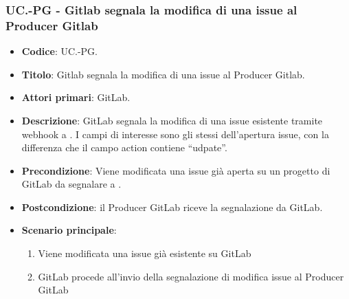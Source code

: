 
\subsubsection{UC\theuccount.\thesubuccount-PG - Gitlab segnala la modifica di una issue al Producer Gitlab}
\begin{itemize}
    \item \textbf{Codice}: UC\theuccount.\thesubuccount-PG.
    \item \textbf{Titolo}: Gitlab segnala la modifica di una issue al Producer Gitlab.
    \item \textbf{Attori primari}: GitLab.
    \item \textbf{Descrizione}: GitLab segnala la modifica di una issue esistente tramite webhook a
    \newline \progetto.
    I campi di interesse sono gli stessi dell'apertura issue, con la differenza che il campo action contiene ``udpate''.
    \item \textbf{Precondizione}: Viene modificata una issue già aperta su un
    progetto di GitLab da segnalare a \progetto.
    \item \textbf{Postcondizione}: il Producer GitLab riceve la segnalazione da GitLab.
    \item \textbf{Scenario principale}: 
    \begin{enumerate}
        \item Viene modificata una issue già esistente su GitLab
        \item GitLab procede all'invio della segnalazione di modifica issue al Producer GitLab
    \end{enumerate}
    
\end{itemize}


